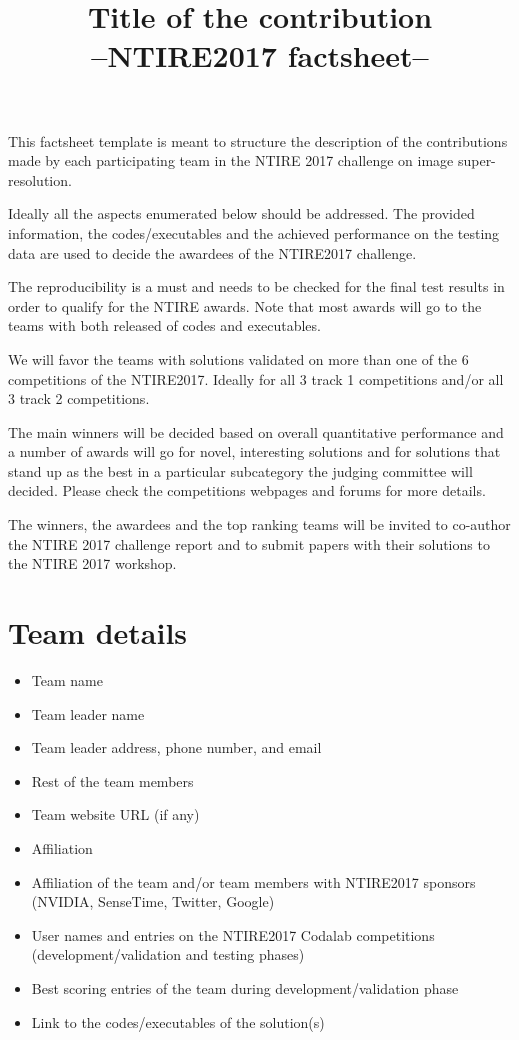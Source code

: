 \documentclass{article}
\title{Title of the contribution\\--NTIRE2017 factsheet--}
\begin{document}
\maketitle

This factsheet template is meant to structure the description of the contributions made by each participating team in the NTIRE 2017 challenge on image super-resolution.

Ideally all the aspects enumerated below should be addressed.
The provided information, the codes/executables and the achieved performance on the testing data are used to decide the awardees of the NTIRE2017 challenge.

The reproducibility is a must and needs to be checked for the final test results in order to qualify for the NTIRE awards. Note that most awards will go to the teams with both released of codes and executables. 

We will favor the teams with solutions validated on more than one of the 6 competitions of the NTIRE2017. Ideally for all 3 track 1 competitions and/or all 3 track 2 competitions. 

The main winners will be decided based on overall quantitative performance and a number of awards will go for novel, interesting solutions and for solutions that stand up as the best in a particular subcategory the judging committee will decided. Please check the competitions webpages and forums for more details.

The winners, the awardees and the top ranking teams will be invited to co-author the NTIRE 2017 challenge report and to submit papers with their solutions to the NTIRE 2017 workshop.

\section{Team details}

\begin{itemize}
\item Team name                                  
\item Team leader name                           
\item Team leader address, phone number, and email 
\item Rest of the team members        
\item Team website URL (if any)                   
\item Affiliation
\item Affiliation of the team and/or team members with NTIRE2017 sponsors (NVIDIA, SenseTime, Twitter, Google)
\item User names and entries on the NTIRE2017 Codalab competitions (development/validation and testing phases)
\item Best scoring entries of the team during development/validation phase
\item Link to the codes/executables of the solution(s)
\end{itemize}
\end{document}
